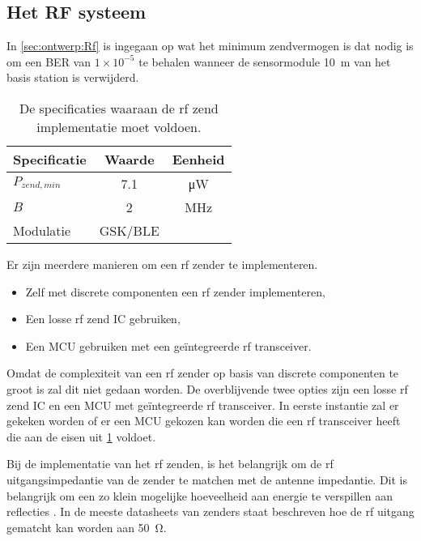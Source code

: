 \subsection{Het RF systeem}
In \cref{sec:ontwerp:Rf} is ingegaan op wat het minimum zendvermogen is dat nodig is om een BER van $1\times 10^{-5}$ te behalen wanneer de \si{\pH} sensormodule \qty{10}{\meter} van het basis station is verwijderd.
\begin{table}[!htbp]
    \centering
    \begin{tabular}{l|c|c}
        Specificatie    & Waarde    & Eenheid \\\hline
        $P_{zend,min}$  & 7.1       & \si{\micro\watt}  \\
        $B$             & 2         & \si{\mega\hertz}  \\
        Modulatie       & GSK/BLE   &                   \\
    \end{tabular}
    \caption{De specificaties waaraan de rf zend implementatie moet voldoen.}
    \label{tab:specRfsending}
\end{table}

Er zijn meerdere manieren om een rf zender te implementeren.
\begin{itemize}
    \item Zelf met discrete componenten een rf zender implementeren,
    \item Een losse rf zend IC gebruiken,
    \item Een MCU gebruiken met een geïntegreerde rf transceiver.
\end{itemize}
Omdat de complexiteit van een rf zender op basis van discrete componenten te groot is zal dit niet gedaan worden. De overblijvende twee opties zijn een losse rf zend IC en een MCU met geïntegreerde rf transceiver. In eerste instantie zal er gekeken worden of er een MCU gekozen kan worden die een rf transceiver heeft die aan de eisen uit \cref{tab:specRfsending} voldoet.

Bij de implementatie van het rf zenden, is het belangrijk om de rf uitgangsimpedantie van de zender te matchen met de antenne impedantie. Dit is belangrijk om een zo klein mogelijke hoeveelheid aan energie te verspillen aan reflecties \cite{FundamentalsofAppliedElectromagnetics}. In de meeste datasheets van zenders staat beschreven hoe de rf uitgang gematcht kan worden aan \qty{50}{\ohm}.
